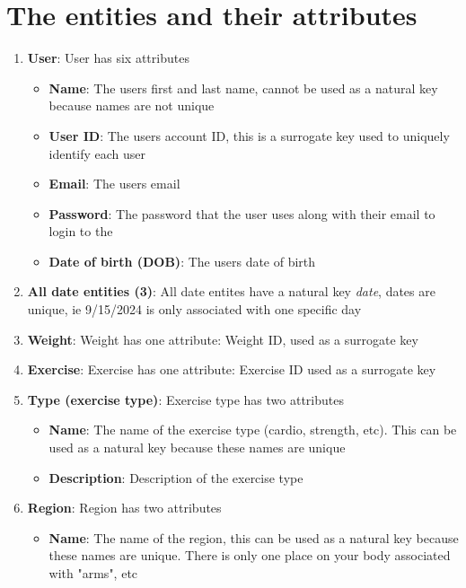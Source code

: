 \documentclass{report}
\begin{document}
    \pagebreak \bigbreak \noindent 
    \section{The entities and their attributes}
    \bigbreak \noindent 
    \bigbreak \noindent 
    \begin{enumerate}
        \item \textbf{User}: User has six attributes
            \begin{itemize}
                \item \textbf{Name}: The users first and last name, cannot be used as a natural key because names are not unique
                \item \textbf{User ID}: The users account ID, this is a surrogate key used to uniquely identify each user
                \item \textbf{Email}: The users email 
                \item \textbf{Password}: The password that the user uses along with their email to login to the \approx 
                \item \textbf{Date of birth (DOB)}: The users date of birth 
            \end{itemize}
        \item \textbf{All date entities (3)}: All date entites have a natural key \textit{date}, dates are unique, ie 9/15/2024 is only associated with one specific day
        \item \textbf{Weight}: Weight has one attribute: Weight ID, used as a surrogate key
        \item \textbf{Exercise}: Exercise has one attribute: Exercise ID used as a surrogate key
        \item \textbf{Type (exercise type)}: Exercise type has two attributes
            \begin{itemize}
                \item \textbf{Name}: The name of the exercise type (cardio, strength, etc). This can be used as a natural key because these names are unique
                \item \textbf{Description}: Description of the exercise type
            \end{itemize}
        \item \textbf{Region}: Region has two attributes
            \begin{itemize}
                \item \textbf{Name}: The name of the region, this can be used as a natural key because these names are unique. There is only one place on your body associated with "arms", etc

\end{itemize}
\end{enumerate}
\end{document}
